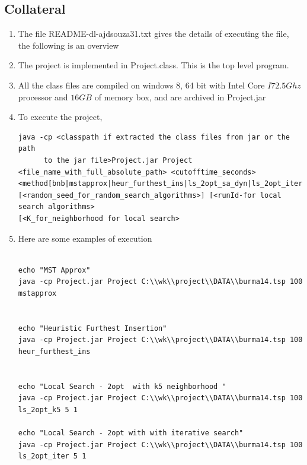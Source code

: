 \documentclass[twoside,11pt]{article}
\begin{document}
\subsection{Collateral}
\begin{enumerate}
\item
The file README-dl-ajdsouza31.txt gives the details of executing the file, the following is an overview
\item
The project is implemented in Project.class. This is the top level program.
\item
All the class files are compiled on windows 8, 64 bit with Intel Core $I7 2.5 Ghz$ processor and $16GB$ of memory box, and are archived in Project.jar
\item
To execute the project, 
\begin{lstlisting}
java -cp <classpath if extracted the class files from jar or the path 
      to the jar file>Project.jar Project
<file_name_with_full_absolute_path> <cutofftime_seconds>
<method[bnb|mstapprox|heur_furthest_ins|ls_2opt_sa_dyn|ls_2opt_iter|ls_2opt_k5|ls_2opt_kall|ls_2opt_sa_k5|ls_2opt_sa_kall]> 
[<random_seed_for_random_search_algorithms>] [<runId-for local search algorithms>
[<K_for_neighborhood for local search>
\end{lstlisting}
\item
Here are some examples of execution
\begin{lstlisting}

echo "MST Approx"
java -cp Project.jar Project C:\\wk\\project\\DATA\\burma14.tsp 100 mstapprox


echo "Heuristic Furthest Insertion"
java -cp Project.jar Project C:\\wk\\project\\DATA\\burma14.tsp 100 heur_furthest_ins


echo "Local Search - 2opt  with k5 neighborhood "
java -cp Project.jar Project C:\\wk\\project\\DATA\\burma14.tsp 100 ls_2opt_k5 5 1

echo "Local Search - 2opt with with iterative search"
java -cp Project.jar Project C:\\wk\\project\\DATA\\burma14.tsp 100 ls_2opt_iter 5 1



\end{lstlisting}
\end{enumerate}
\end{document}
